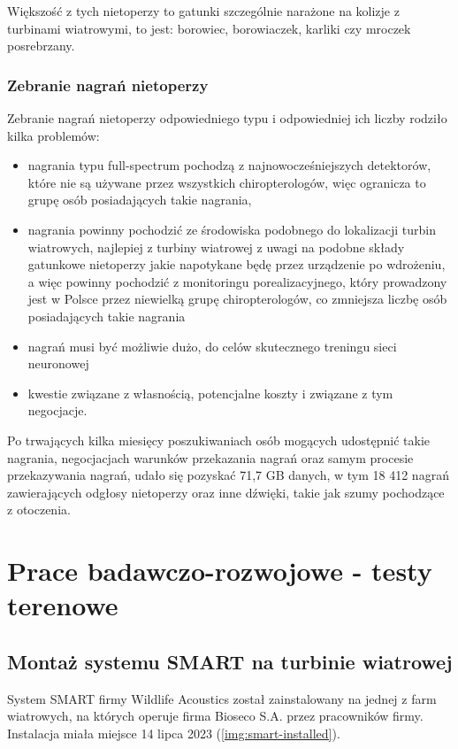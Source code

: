 \documentclass{sprz}
\begin{document}
Większość z tych nietoperzy to gatunki szczególnie narażone na kolizje z turbinami wiatrowymi, to jest: borowiec, borowiaczek, karliki czy mroczek posrebrzany.

\subsection{Zebranie nagrań nietoperzy}
Zebranie nagrań nietoperzy odpowiedniego typu i odpowiedniej ich liczby rodziło kilka problemów:
\begin{itemize}
  \item{nagrania typu full-spectrum pochodzą z najnowocześniejszych detektorów, które nie są używane przez wszystkich chiropterologów, więc ogranicza to grupę osób posiadających takie nagrania,}
  \item{nagrania powinny pochodzić ze środowiska podobnego do lokalizacji turbin wiatrowych, najlepiej z turbiny wiatrowej z uwagi na podobne składy gatunkowe nietoperzy jakie napotykane będę przez urządzenie po wdrożeniu, a więc powinny pochodzić z monitoringu porealizacyjnego, który prowadzony jest w Polsce przez niewielką grupę chiropterologów, co zmniejsza liczbę osób posiadających takie nagrania}
  \item{nagrań musi być możliwie dużo, do celów skutecznego treningu sieci neuronowej}
  \item{kwestie związane z własnością, potencjalne koszty i związane z tym negocjacje.}
\end{itemize}

Po trwających kilka miesięcy poszukiwaniach osób mogących udostępnić takie nagrania, negocjacjach warunków przekazania nagrań oraz samym procesie przekazywania nagrań, udało się pozyskać 71,7 GB danych, w tym 18 412 nagrań zawierających odgłosy nietoperzy oraz inne dźwięki, takie jak szumy pochodzące z otoczenia.

\chapter{Prace badawczo-rozwojowe - testy terenowe}

\section{Montaż systemu SMART na turbinie wiatrowej}
System SMART firmy Wildlife Acoustics został zainstalowany na jednej z farm wiatrowych, na których operuje firma Bioseco S.A. przez pracowników firmy. Instalacja miała miejsce 14 lipca 2023 (\ref{img:smart-installed}). 
\end{document}

